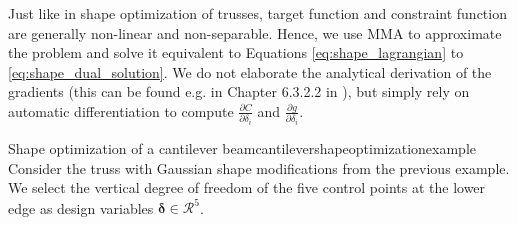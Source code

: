 Just like in shape optimization of trusses, target function and constraint function are generally non-linear and non-separable. Hence, we use MMA to approximate the problem and solve it equivalent to Equations \eqref{eq:shape_lagrangian} to \eqref{eq:shape_dual_solution}. We do not elaborate the analytical derivation of the gradients (this can be found e.g. in Chapter 6.3.2.2 in \cite{Christensen2008}), but simply rely on automatic differentiation to compute $\frac{\partial C}{\partial \delta_i}$ and $\frac{\partial g}{\partial \delta_i}$.


\begin{example}{Shape optimization of a cantilever beam}{cantilevershapeoptimizationexample}
    Consider the truss with Gaussian shape modifications from the previous example. We select the vertical degree of freedom of the five control points at the lower edge as design variables $\pmb{\delta} \in \mathcal{R}^5$.


\end{example}
